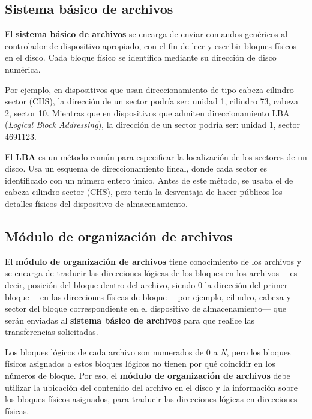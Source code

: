 \subsection{Sistema básico de
archivos}\label{_sistema_buxe1sico_de_archivos}

{} El \textbf{sistema básico de archivos} se encarga de enviar comandos
genéricos al controlador de dispositivo apropiado, con el fin de leer y
escribir bloques físicos en el disco. Cada bloque físico se identifica
mediante su dirección de disco numérica.

Por ejemplo, en dispositivos que usan direccionamiento de tipo
cabeza-cilindro-sector (CHS), la dirección de un sector podría ser:
unidad 1, cilindro 73, cabeza 2, sector 10. Mientras que en dispositivos
que admiten direccionamiento LBA (\emph{Logical Block Addressing}), la
dirección de un sector podría ser: unidad 1, sector 4691123.

El \textbf{{}LBA} es un método común para especificar la localización de
los sectores de un disco. Usa un esquema de direccionamiento lineal,
donde cada sector es identificado con un número entero único. Antes de
este método, se usaba el de cabeza-cilindro-sector (CHS), pero tenía la
desventaja de hacer públicos los detalles físicos del dispositivo de
almacenamiento.

\subsection{Módulo de organización de
archivos}\label{_muxf3dulo_de_organizaciuxf3n_de_archivos}

{} El \textbf{módulo de organización de archivos} tiene conocimiento de
los archivos y se encarga de traducir las direcciones lógicas de los
bloques en los archivos ---es decir, posición del bloque dentro del
archivo, siendo 0 la dirección del primer bloque--- en las direcciones
físicas de bloque ---por ejemplo, cilindro, cabeza y sector del bloque
correspondiente en el dispositivo de almacenamiento--- que serán
enviadas al \textbf{sistema básico de archivos} para que realice las
transferencias solicitadas.

Los bloques lógicos de cada archivo son numerados de 0 a \emph{N}, pero
los bloques físicos asignados a estos bloques lógicos no tienen por qué
coincidir en los números de bloque. Por eso, el \textbf{módulo de
organización de archivos} debe utilizar la ubicación del contenido del
archivo en el disco y la información sobre los bloques físicos
asignados, para traducir las direcciones lógicas en direcciones físicas.

